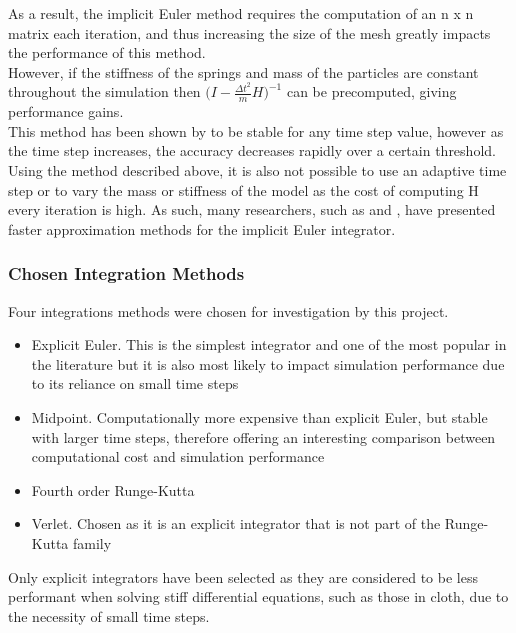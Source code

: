 As a result, the implicit Euler method requires the computation of an n x n matrix each iteration, and thus increasing the size of the mesh greatly impacts the performance of this method.
\\However, if the stiffness of the springs and mass of the particles are constant throughout the simulation then $\bigg(I - \frac{\Delta t^{2}}{m}H\bigg)^{-1}$ can be precomputed, giving performance gains.
\\This method has been shown by \textcite{Volino2001} to be stable for any time step value, however as the time step increases, the accuracy decreases rapidly over a certain threshold. Using the method described above, it is also not possible to use an adaptive time step or to vary the mass or stiffness of the model as the cost of computing H every iteration is high. As such, many researchers, such as \textcite{Mesit2007} and \textcite{Kang2000}, have presented faster approximation methods for the implicit Euler integrator.

\subsubsection{Chosen Integration Methods}
Four integrations methods were chosen for investigation by this project.
\begin{itemize}
\item{Explicit Euler. This is the simplest integrator and one of the most popular in the literature but it is also most likely to impact simulation performance due to its reliance on small time steps}
\item{Midpoint. Computationally more expensive than explicit Euler, but stable with larger time steps, therefore offering an interesting comparison between computational cost and simulation performance}
\item{Fourth order Runge-Kutta}
\item{Verlet. Chosen as it is an explicit integrator that is not part of the Runge-Kutta family}
\end{itemize}
Only explicit integrators have been selected as they are considered to be less performant when solving stiff differential equations, such as those in cloth, due to the necessity of small time steps.